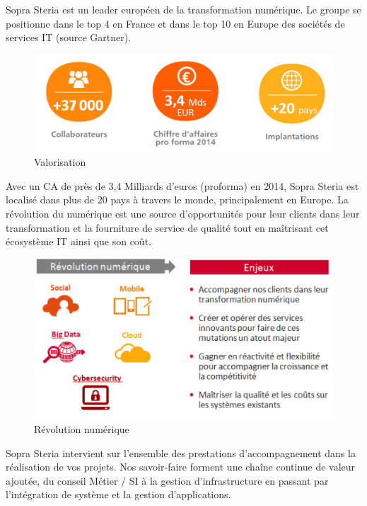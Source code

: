 \documentclass[a4paper]{memoir}
\begin{document}
Sopra Steria est un leader européen de la transformation numérique. Le groupe se positionne dans le top 4 en France et dans le top 10 en Europe des sociétés de services IT (source Gartner).

\newpage

\begin{figure}[!ht]
\center
\includegraphics[width=1\textwidth]{./images/sopra2.png}
\caption{Valorisation}
\label{Sopra+Steria+chiffre}
\end{figure}

Avec un CA de près de 3,4 Milliards d’euros (proforma) en 2014, Sopra Steria est localisé dans plus de 20 pays à travers le monde, principalement en Europe.
La révolution du numérique est une source d’opportunités pour leur clients dans leur transformation et la fourniture de service de qualité tout en maîtrisant cet écosystème IT ainsi que son coût.

\begin{figure}[!ht]
\center
\includegraphics[width=1\textwidth]{./images/sopra3.png}
\caption{Révolution numérique}
\label{Révolution numérique}
\end{figure}

Sopra Steria intervient sur l’ensemble des prestations d’accompagnement dans la réalisation de vos projets.
Nos savoir-faire forment une chaîne continue de valeur ajoutée, du conseil Métier / SI à la gestion d’infrastructure en passant par l’intégration de système et la gestion d’applications.
\end{document}

